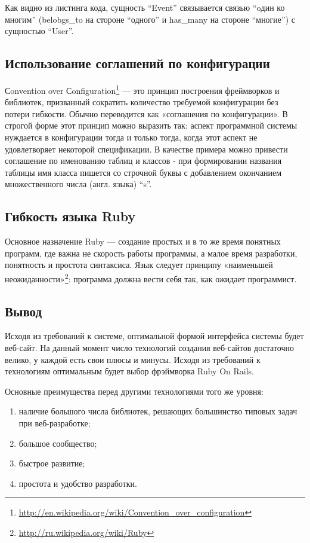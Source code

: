 Как видно из листинга кода, сущность ``Event'' связывается связью ``oдин ко
многим'' (belobgs\_to на стороне ``одного'' и has\_many на стороне ``многие'') с сущностью
``User''.

\subsection{Использование соглашений по конфигурации}
Сonvention over Сonfiguration\footnote{
	\url{http://en.wikipedia.org/wiki/Convention_over_configuration}
} — это принцип построения фреймворков и
библиотек, призванный сократить количество требуемой конфигурации без потери гибкости.
Обычно переводится как «соглашения по конфигурации».
В строгой форме этот принцип можно выразить так: аспект программной системы
нуждается в конфигурации тогда и только тогда, когда этот аспект не
удовлетворяет некоторой спецификации.
В качестве примера можно привести соглашение по именованию таблиц и классов -
при формировании названия таблицы имя класса пишется со строчной буквы с
добавлением окончанием множественного числа (англ. языка) “s”.

\subsection{Гибкость языка Ruby}
Основное назначение Ruby — создание простых и в то же время понятных программ,
где важна не скорость работы программы, а малое время разработки, понятность и
простота синтаксиса. Язык следует принципу «наименьшей неожиданности»\footnote{
	\url{http://ru.wikipedia.org/wiki/Ruby}
}: программа должна вести себя так, как ожидает программист.

\subsection{Вывод}
Исходя из требований к системе, оптимальной формой интерфейса системы будет
веб-сайт. На данный момент число технологий создания веб-сайтов достаточно
велико, у каждой есть свои плюсы и минусы. Исходя из требований к технологиям
оптимальным будет выбор фрэймворка Ruby On Rails.

Основные преимущества перед другими технологиями того же уровня:
\begin{enumerate}
  \item наличие большого числа библиотек, решающих большинство типовых задач при веб-разработке;
  \item большое сообщество;
  \item быстрое развитие;
  \item простота и удобство разработки. 
\end{enumerate}


